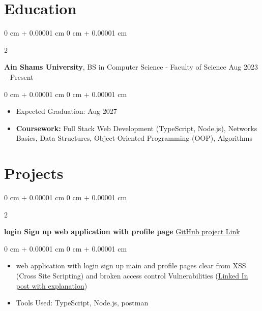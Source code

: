 \documentclass[10pt, letterpaper]{article}
\newenvironment{highlights}{
    \begin{itemize}[
        topsep=0.10 cm,
        parsep=0.10 cm,
        partopsep=0pt,
        itemsep=0pt,
        leftmargin=0 cm + 10pt
    ]
}{
    \end{itemize}
} %
\newenvironment{onecolentry}{
    \begin{adjustwidth}{
        0 cm + 0.00001 cm
    }{
        0 cm + 0.00001 cm
    }
}{
    \end{adjustwidth}
} %
\newenvironment{twocolentry}[2][]{
    \onecolentry
    \def\secondColumn{#2}
    \setcolumnwidth{\fill, 4.5 cm}
    \begin{paracol}{2}
}{
    \switchcolumn \raggedleft \secondColumn
    \end{paracol}
    \endonecolentry
} %
\begin{document}

    \section{Education}
        \begin{twocolentry}{
            Aug 2023 – Present
        }
            \textbf{Ain Shams University}, BS in Computer Science - Faculty of Science \end{twocolentry}

        \vspace{0.10 cm}
        \begin{onecolentry}
            \begin{highlights}
                \item Expected Graduation: Aug 2027
                \item \textbf{Coursework:} Full Stack Web Development (TypeScript, Node.js), Networks Basics, Data Structures, Object-Oriented Programming (OOP), Algorithms
            \end{highlights}
        \end{onecolentry}

    
    \section{Projects}


        \begin{twocolentry}{
            \href{https://github.com/samir176520/comp206-webDeveloping-/tree/main/lab9}{GitHub project Link}
        }
            \textbf{login Sign up web application with profile page}\end{twocolentry}
        \vspace{0.10 cm}
        \begin{onecolentry}
            \begin{highlights}
                \item web application with login sign up main and profile pages clear from XSS (Cross Site Scripting) and broken access control Vulnerabilities (\href{https://www.linkedin.com/posts/samir176520_%D8%A7%D9%84%D8%B3%D9%84%D8%A7%D9%85-%D8%B9%D9%84%D9%8A%D9%83%D9%85-%D8%A8%D9%82%D8%A7%D9%84%D9%8A-%D9%81%D8%AA%D8%B1%D9%87-%D8%A8%D8%B0%D8%A7%D9%83%D8%B1-nodejs-%D8%B9%D9%84%D8%B4%D8%A7%D9%86-activity-7327034973918519298-h_vp}{Linked In post with explanation})
                \item Tools Used: TypeScript, Node.js, postman
            \end{highlights}
        \end{onecolentry}
\end{document}
